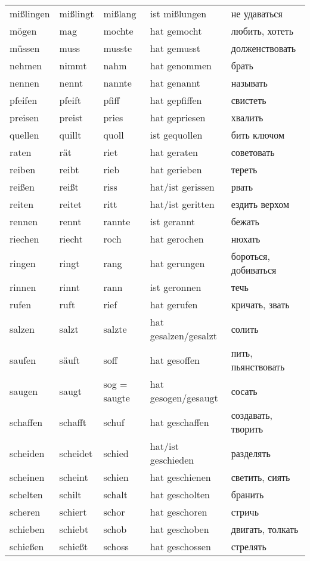 \begin{longtable}{|l|l|l|l|l|}
mi\ss lingen & mi\ss lingt & mi\ss lang & ist mi\ss lungen & не удаваться \\
m\"ogen & mag & mochte & hat gemocht & любить, хотеть \\
m\"ussen & muss & musste & hat gemusst & долженствовать \\
nehmen & nimmt & nahm & hat genommen & брать \\
nennen & nennt & nannte & hat genannt & называть \\
pfeifen & pfeift & pfiff & hat gepfiffen & свистеть \\
preisen & preist & pries & hat gepriesen & хвалить \\
quellen & quillt & quoll & ist gequollen & бить ключом \\
raten & r\"at & riet & hat geraten & советовать \\
reiben & reibt & rieb & hat gerieben & тереть \\
rei\ss en & rei\ss t & riss & hat/ist gerissen & рвать \\
reiten & reitet & ritt & hat/ist geritten & ездить верхом \\
rennen & rennt & rannte & ist gerannt & бежать \\
riechen & riecht & roch & hat gerochen & нюхать \\
ringen & ringt & rang & hat gerungen & бороться, добиваться \\
rinnen & rinnt & rann & ist geronnen & течь \\
rufen & ruft & rief & hat gerufen & кричать, звать \\
salzen & salzt & salzte & hat gesalzen/gesalzt & солить \\
saufen & s\"auft & soff & hat gesoffen & пить, пьянствовать \\
saugen & saugt & sog = saugte & hat gesogen/gesaugt & сосать \\
schaffen & schafft & schuf & hat geschaffen & создавать, творить \\
scheiden & scheidet & schied & hat/ist geschieden & разделять \\
scheinen & scheint & schien & hat geschienen & светить, сиять \\
schelten & schilt & schalt & hat gescholten & бранить \\
scheren & schiert & schor & hat geschoren & стричь \\
schieben & schiebt & schob & hat geschoben & двигать, толкать \\
schie\ss en & schie\ss t & schoss & hat geschossen & стрелять \\

\end{longtable}
